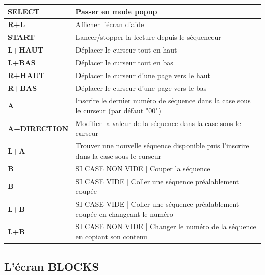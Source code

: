 \documentclass[12pt,a4paper]{article}
\begin{document}
        \tablelasttail{\hline}
        \begin{supertabular}{|l|p{11cm}|}
        \hline
            {\bf SELECT} & Passer en mode popup \\
            \hline
            {\bf R+L} & Afficher l'écran d'aide \\
            \hline
            {\bf START} & Lancer/stopper la lecture depuis le séquenceur \\
            \hline
            {\bf L+HAUT} & Déplacer le curseur tout en haut \\
            \hline
            {\bf L+BAS} & Déplacer le curseur tout en bas \\
            \hline
            {\bf R+HAUT} & Déplacer le curseur d'une page vers le haut \\
            \hline
            {\bf R+BAS} & Déplacer le curseur d'une page vers le bas \\
            \hline
            {\bf A} & Inscrire le dernier numéro de séquence dans la case sous le curseur (par défaut "00") \\
            \hline
            {\bf A+DIRECTION} & Modifier la valeur de la séquence dans la case sous le curseur \\
            \hline
            {\bf L+A} & Trouver une nouvelle séquence disponible puis l'inscrire dans la case sous le curseur \\
            \hline
            {\bf B} & SI CASE NON VIDE | Couper la séquence \\
            \hline
            {\bf B} & SI CASE VIDE | Coller une séquence préalablement coupée \\
            \hline
            {\bf L+B} & SI CASE VIDE | Coller une séquence préalablement coupée en changeant le numéro \\
            \hline
            {\bf L+B} & SI CASE NON VIDE | Changer le numéro de la séquence en copiant son contenu \\
        \hline
        \end{supertabular}
        
    \subsection{L'écran BLOCKS}
\end{document}
